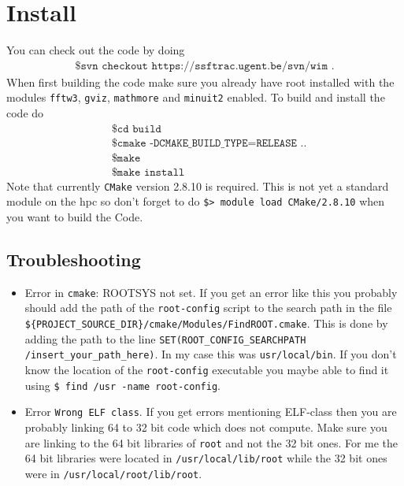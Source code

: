 \section{Install}
You can check out the code by doing
\begin{align*}
	\texttt{\$ svn checkout https://ssftrac.ugent.be/svn/wim .}
\end{align*}
When first building the code make sure you already have root installed with the modules \texttt{fftw3}, \texttt{gviz}, \texttt{mathmore} and \texttt{minuit2} enabled. To build and install the code do
\begin{align*}
    & \texttt{\$ cd build} \\
	& \texttt{\$ cmake -DCMAKE\_BUILD\_TYPE=RELEASE ..} \\
	& \texttt{\$ make } \\
	& \texttt{\$ make install } 
\end{align*}
Note that currently \texttt{CMake} version 2.8.10 is required. This is not yet a standard module on the hpc so don't forget to do \texttt{\$> module load CMake/2.8.10} when you want to build the Code.
\subsection{Troubleshooting}
\begin{itemize}
\item Error in \texttt{cmake}: ROOTSYS not set.
If you get an error like this you probably should add the path of the \texttt{root-config} script to the search path in the file \texttt{\$\{PROJECT\_SOURCE\_DIR\}/cmake/Modules/FindROOT.cmake}. This is done by adding the path to the line \texttt{SET(ROOT\_CONFIG\_SEARCHPATH /insert\_your\_path\_here)}. In my case this was \texttt{usr/local/bin}. If you don't know the location of the \texttt{root-config} executable you maybe able to find it using \texttt{\$ find /usr -name root-config}.
\item Error \texttt{Wrong ELF class}. If you get errors mentioning ELF-class then you are probably linking 64 to 32 bit code which does not compute. Make sure you are linking to the 64 bit libraries of \texttt{root} and not the 32 bit ones. For me the 64 bit libraries were located in \texttt{/usr/local/lib/root} while the 32 bit ones were in \texttt{/usr/local/root/lib/root}. 
\end{itemize}
